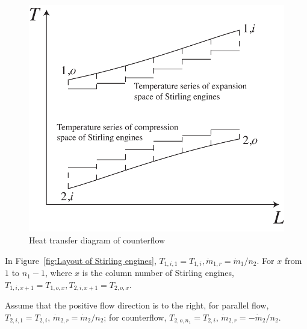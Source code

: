\noindent \begin{figure}[htbp]
\begin{center}
	\includegraphics[width = 0.7\columnwidth]{fig/HeatTransfer_Counter}
	\caption{Heat transfer diagram of counterflow}
	\label{fig:CounterFlow}
\end{center}
\end{figure}

In Figure~\ref{fig:Layout of Stirling engines}, $T_{1,i,1}=T_{1,i},\dot{m}_{1,r}=\dot{m}_{1}/n_{2}$. For $x$ from $1$ to $n_1-1$, where $x$ is the column number of Stirling engines, $T_{1,i,x+1}=T_{1,o,x},T_{2,i,x+1}=T_{2,o,x}$.

Assume that the positive flow direction is to the right, for parallel flow, $T_{2,i,1}=T_{2,i}$, $\dot{m}_{2,r}=\dot{m}_{2}/n_{2}$; for counterflow, $T_{2,o,n_1}=T_{2,i}$, $\dot{m}_{2,r}=-\dot{m}_{2}/n_{2}$.


%

